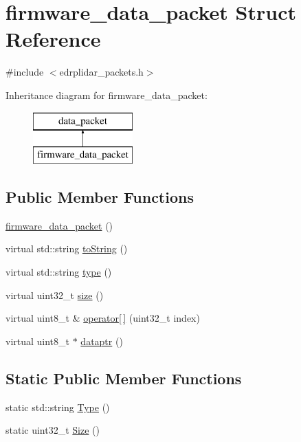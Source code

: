 \hypertarget{structfirmware__data__packet}{\section{firmware\-\_\-data\-\_\-packet Struct Reference}
\label{structfirmware__data__packet}
}


{\ttfamily \#include $<$edrplidar\-\_\-packets.\-h$>$}

Inheritance diagram for firmware\-\_\-data\-\_\-packet\-:\begin{figure}[H]
\begin{center}
\leavevmode
\includegraphics[height=2.000000cm]{structfirmware__data__packet}
\end{center}
\end{figure}
\subsection*{Public Member Functions}
\begin{DoxyCompactItemize}
\item 
\hyperlink{structfirmware__data__packet_a084123acea6482ea08949203f5ed9f40}{firmware\-\_\-data\-\_\-packet} ()
\item 
virtual std\-::string \hyperlink{structfirmware__data__packet_a1ff72c5345b4325fd955bb20c9860d89}{to\-String} ()
\item 
virtual std\-::string \hyperlink{structfirmware__data__packet_a84cd6f60b9d5ef46ab5c4695d6de3d48}{type} ()
\item 
virtual uint32\-\_\-t \hyperlink{structfirmware__data__packet_a3231148228aee555265b90ab30fea9ec}{size} ()
\item 
virtual uint8\-\_\-t \& \hyperlink{structfirmware__data__packet_a16d28be180847cb45fc4dbf0417756b9}{operator\mbox{[}$\,$\mbox{]}} (uint32\-\_\-t index)
\item 
virtual uint8\-\_\-t $\ast$ \hyperlink{structfirmware__data__packet_ab080f05c847592a2578ee307d5af31fc}{dataptr} ()
\end{DoxyCompactItemize}
\subsection*{Static Public Member Functions}
\begin{DoxyCompactItemize}
\item 
static std\-::string \hyperlink{structfirmware__data__packet_a6b386640d9fa172bfa44c55d63add943}{Type} ()
\item 
static uint32\-\_\-t \hyperlink{structfirmware__data__packet_a91ec8c2d5f0f7f642027b0ed566417d0}{Size} ()
\end{DoxyCompactItemize}
